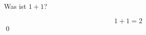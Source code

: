 \documentclass{abgabe}
\begin{document}
\begin{questions}
    \question
    Was ist $1 + 1$?
    \begin{solution}
        $$
            1 + 1 = 2
        $$\qed
    \end{solution}
\end{questions}
\end{document}
